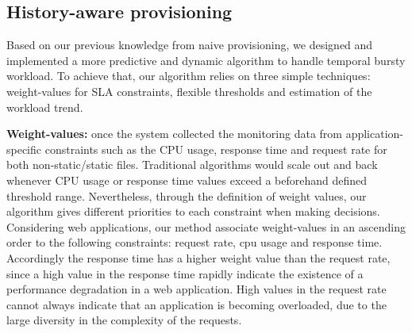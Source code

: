 





\subsection{History-aware provisioning}
Based on our previous knowledge from naive provisioning, we designed and implemented a more predictive and dynamic algorithm to handle temporal bursty workload. To achieve that, our algorithm relies on three simple techniques: weight-values for SLA constraints, flexible thresholds and  estimation of the workload trend. 


\textbf{Weight-values:} once the system collected the monitoring data from application-specific constraints such as the CPU usage, response time and request rate for both non-static/static files. Traditional algorithms would scale out and back whenever CPU usage or response time values  exceed a beforehand defined threshold range. Nevertheless,  through the definition of weight values, our algorithm gives different priorities to each constraint when making decisions. 
Considering web applications, our method associate weight-values in an ascending order to the following constraints: request rate, cpu usage and response time. Accordingly the response time has a higher weight value than the request rate, since a high value in the response time rapidly indicate the existence of a performance degradation in a web application. High values in the request rate cannot always indicate that an application is becoming overloaded, due to the large diversity in the complexity of the requests.

